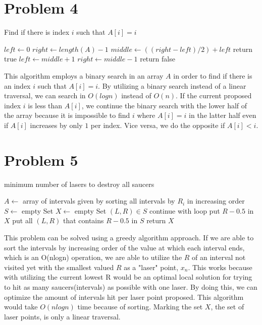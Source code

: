 \documentclass[12pt]{article}
\begin{document}
\newpage
\section*{Problem 4}
\begin{algorithm}
\caption{Find if there is index $i$ such that $A[i]=i$}
\begin{algorithmic}[1]
\State $left \gets 0$ 
\State $right \gets length(A) - 1$
    \State $middle \gets ((right-left)/2) + left$
        \State return true
    \EndIf
        \State $left \gets middle + 1$
    \Else 
            \State $right \gets middle - 1$
        \EndIf
    \EndIf
\EndWhile
\State return false
\end{algorithmic}
\end{algorithm}
This algorithm employs a binary search in an array $A$ in order to find if there is an index $i$ such
that $A[i]=i$. By utilizing a binary search instead of a linear traversal, we can search in $O(logn)$ 
instead of $O(n)$. If the current proposed index $i$ is less than $A[i]$, we continue the binary search
with the lower half of the array because it is impossible to find $i$ where $A[i]=i$ in the latter half
even if $A[i]$ increases by only $1$ per index. Vice versa, we do the opposite if $A[i]<i$.

\newpage
\section*{Problem 5}
\begin{algorithm}
\caption{minimum number of lasers to destroy all saucers}
\begin{algorithmic}
\State $A \gets $ array of intervals given by sorting all intervals by $R_i$ in increasing order
\State $S \gets $ empty Set
\State $X \gets $ empty Set
    \If $(L, R) \in S$
        \State continue with loop
    \EndIf
    \State put $R - 0.5$ in $X$
    \State put all $(L, R)$ that contains $R - 0.5$ in $S$
\EndFor
\State return $X$
\end{algorithmic}
\end{algorithm}
This problem can be solved using a greedy algorithm approach. If we are able to sort the intervals
by increasing order of the value at which each interval ends, which is an O(nlogn) operation, we are 
able to utilize the $R$ of an interval not visited yet with the smallest valued $R$ as a "laser" point, $x_n$. This works
because with utilizing the current lowest R would be an optimal local solution for trying to hit as many
saucers(intervals) as possible with one laser. By doing this, we can optimize the amount of intervals hit
per laser point proposed. This algorithm would take $O(nlogn)$ time because of sorting. Marking the set $X$,
the set of laser points, is only a linear traversal.
\end{document}

